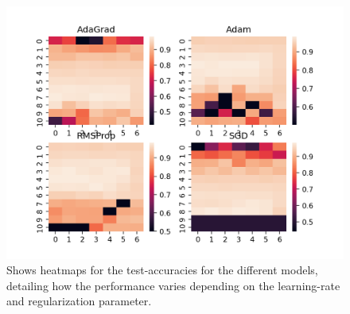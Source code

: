 \documentclass{article}
\begin{document}
\begin{figure}
	\centering
	\includegraphics[scale=0.8]{nn_test_accuracy_hm}
	\caption{Shows heatmaps for the test-accuracies for the different
		models, detailing how the performance varies depending on the
		learning-rate and regularization parameter.}
	\label{nntestacchm}
\end{figure}
\end{document}
